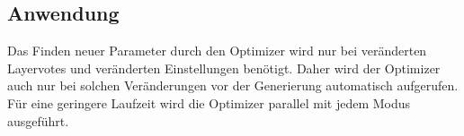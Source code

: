 \subsection{Anwendung}
Das Finden neuer Parameter durch den Optimizer wird nur bei veränderten Layervotes und veränderten Einstellungen benötigt.
Daher wird der Optimizer auch nur bei solchen Veränderungen vor der Generierung automatisch aufgerufen. 
Für eine geringere Laufzeit wird die Optimizer parallel mit jedem Modus ausgeführt.